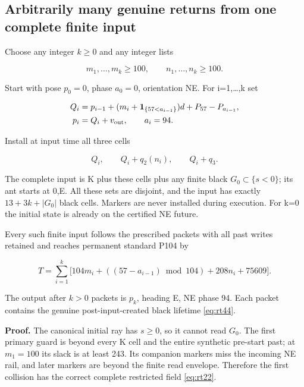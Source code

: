 \subsection{Arbitrarily many genuine returns from one complete finite
input}\label{returns-8}

Choose any integer $k\ge0$ and any integer lists

\[
m_1,\ldots,m_k\ge100,\qquad n_1,\ldots,n_k\ge100.
\]

Start with pose $p_0=0$, phase $a_0=0$, orientation NE. For i=1,\ldots,k
set

\begin{equation}\label{eq:rt81}
\begin{aligned}Q_i&=p_{i-1}+(m_i+\mathbf1_{\{57<a_{i-1}\}})d+P_{57}-P_{a_{i-1}},\\p_i&=Q_i+v_{\rm out},\qquad a_i=94.\end{aligned}
\end{equation}

Install at input time all three cells

\[
Q_i,\qquad Q_i+q_2(n_i),\qquad Q_i+q_3.
\]

The complete input is K plus these cells plus any finite black $G_0\subset\{s<0\}$; its ant starts at 0,E. All these sets are disjoint, and
the input has exactly $13+3k+|G_0|$ black cells. Markers
are never installed during execution. For k=0 the initial state is
already on the certified NE future.

\begin{theorem}\label{th:return-train} Every such finite
input follows the prescribed packets with all past writes retained and
reaches permanent standard P104 by

\begin{equation}\label{eq:rt82}
T=\sum_{i=1}^k\bigl[104m_i+((57-a_{i-1})\bmod104)+208n_i+75609\bigr].
\end{equation}

The output after $k>0$ packets is $p_k$, heading E, NE phase 94.
Each packet contains the genuine post-input-created black lifetime
\eqref{eq:rt44}.
\end{theorem}

\textbf{Proof.} The canonical initial ray has $s\ge0$, so it
cannot read $G_0$. The first primary guard is beyond every K cell and the
entire synthetic pre-start past; at $m_1=100$ its slack is at least 243.
Its companion markers miss the incoming NE rail, and later markers are
beyond the finite read envelope. Therefore the first collision has the
correct complete restricted field \eqref{eq:rt22}.


